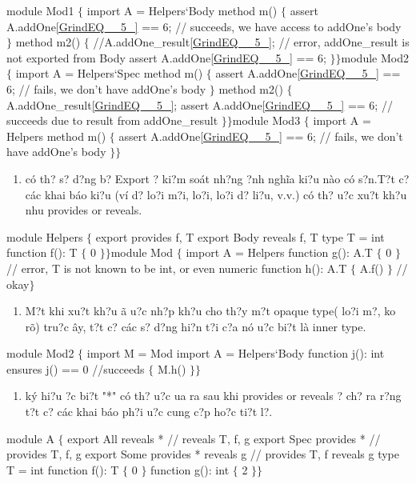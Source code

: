 \documentclass{article} %
\begin{document}
\noindent module Mod1 $\{$  import A = Helpers`Body  method m() $\{$    assert A.addOne\eqref{GrindEQ__5_} == 6; // succeeds, we have access to addOne's body  $\}$  method m2() $\{$    //A.addOne\_result\eqref{GrindEQ__5_}; // error, addOne\_result is not exported from Body    assert A.addOne\eqref{GrindEQ__5_} == 6;  $\}$$\}$module Mod2 $\{$  import A = Helpers`Spec  method m() $\{$    assert A.addOne\eqref{GrindEQ__5_} == 6; // fails, we don't have addOne's body  $\}$  method m2() $\{$    A.addOne\_result\eqref{GrindEQ__5_};    assert A.addOne\eqref{GrindEQ__5_} == 6; // succeeds due to result from addOne\_result  $\}$$\}$module Mod3 $\{$  import A = Helpers  method m() $\{$    assert A.addOne\eqref{GrindEQ__5_} == 6; // fails, we don't have addOne's body  $\}$$\}$

\begin{enumerate}
\item  c\'{o} th? s? d?ng b? Export {\dj}? ki?m so\'{a}t nh?ng {\dj}?nh ngh\~{i}a ki?u n\`{a}o c\'{o} s?n.T?t c? c\'{a}c khai b\'{a}o ki?u (v\'{i} d? lo?i m?i, lo?i, lo?i d? li?u, v.v.) c\'{o} th? {\dj}u?c xu?t kh?u nhu provides or reveals.
\end{enumerate}

\noindent module Helpers $\{$  export provides f, T  export Body reveals f, T  type T = int  function f(): T $\{$ 0 $\}$$\}$module Mod $\{$  import A = Helpers  function g(): A.T $\{$ 0 $\}$ // error, T is not known to be int, or even numeric  function h(): A.T $\{$ A.f() $\}$ // okay$\}$

\begin{enumerate}
\item  M?t khi xu?t kh?u {\dj}\~{a} {\dj}u?c nh?p kh?u cho th?y m?t  opaque type( lo?i m?, ko r\~{o}) tru?c {\dj}\^{a}y, t?t c? c\'{a}c s? d?ng hi?n t?i c?a n\'{o} {\dj}u?c bi?t l\`{a} inner type.
\end{enumerate}

\noindent module Mod2 $\{$  import M = Mod  import A = Helpers`Body  function j(): int    ensures j() == 0 //succeeds  $\{$ M.h() $\}$$\}$

\noindent 

\begin{enumerate}
\item  k\'{y} hi?u {\dj}?c bi?t "*" c\'{o} th? {\dj}u?c {\dj}ua ra sau khi provides or reveals {\dj}? ch? ra r?ng t?t c? c\'{a}c khai b\'{a}o ph?i {\dj}u?c cung c?p ho?c ti?t l?.
\end{enumerate}

\noindent module A $\{$   export All reveals * // reveals T, f, g   export Spec provides * // provides T, f, g   export Some provides * reveals g // provides T, f reveals g   type T = int   function f(): T $\{$ 0 $\}$   function g(): int $\{$ 2 $\}$$\}$
\end{document}
